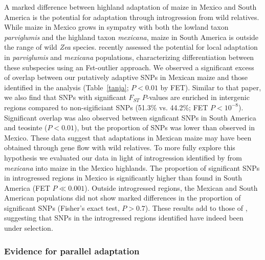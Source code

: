 {A marked difference between highland adaptation of maize in Mexico and South America is the potential for adaptation through introgression from wild relatives.  While maize in Mexico grows in sympatry with both the lowland taxon \textit{parviglumis} and the highland taxon \textit{mexicana}, maize in South America is outside the range of wild \textit{Zea} species.
 \citep{Pyhajarvi2013} recently assessed the potential for local adaptation in \textit{parviglumis} and \textit{mexicana} populations, characterizing differentiation between these subspecies using an Fst-outlier approach.
We observed a significant excess of overlap between our putatively adaptive SNPs in Mexican maize and those identified in the \citep{Pyhajarvi2013} analysis (Table~\ref{tanja}; $P<0.01$ by FET). Similar to that paper, we also find that SNPs with significant $F_{ST}$ $P$-values are enriched in intergenic regions compared to non-sigificiant SNPs (51.3\% vs. 44.2\%; FET $P < 10^{-8}$). Significant overlap was also observed between signficant SNPs in South America and teosinte ($P<0.01$), but the proportion of SNPs was lower than observed in Mexico.  These data suggest that adaptations in Mexican maize may have been obtained through gene flow with wild relatives.  To more fully explore this hypothesis we evaluated our data in light of introgression identified by \citep{Profford_2013} from \textit{mexicana} into maize in the Mexico highlands.  
The proportion of significant SNPs in introgressed regions in Mexico is significantly higher than found in South America (FET $P\ll0.001$).
Outside introgressed regions, the Mexican and South American populations did not show marked differences in the proportion of significant SNPs (Fisher's exact test, $P>0.7$). These results add to those of \citep{Profford_2013}, suggesting that SNPs in the introgressed regions identified have indeed been under selection.  

\subsubsection{Evidence for parallel adaptation}

}
